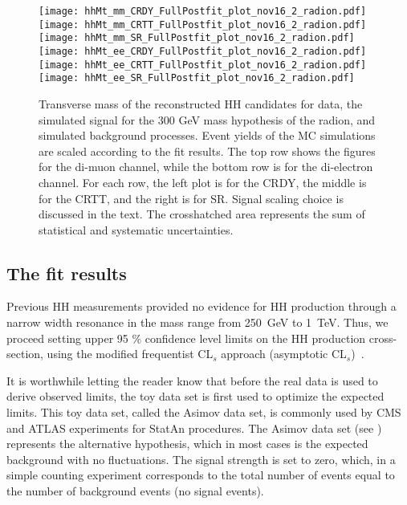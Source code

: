 \begin{figure}[H]
\begin{center}
\texttt{[image: hhMt\_mm\_CRDY\_FullPostfit\_plot\_nov16\_2\_radion.pdf]}
\texttt{[image: hhMt\_mm\_CRTT\_FullPostfit\_plot\_nov16\_2\_radion.pdf]}
\texttt{[image: hhMt\_mm\_SR\_FullPostfit\_plot\_nov16\_2\_radion.pdf]} \\
\texttt{[image: hhMt\_ee\_CRDY\_FullPostfit\_plot\_nov16\_2\_radion.pdf]}
\texttt{[image: hhMt\_ee\_CRTT\_FullPostfit\_plot\_nov16\_2\_radion.pdf]}
\texttt{[image: hhMt\_ee\_SR\_FullPostfit\_plot\_nov16\_2\_radion.pdf]}
\caption[Transverse mass of the reconstructed HH candidates for graviton hypothesis.]{Transverse mass of the reconstructed HH candidates for data, the simulated signal for the 300 GeV mass hypothesis of the radion, and simulated background processes. Event yields of the MC simulations are scaled according to the fit results. The top row shows the figures for the di-muon channel, while the bottom row is for the di-electron channel. For each row, the left plot is for the CRDY, the middle is for the CRTT, and the right is for SR. Signal scaling choice is discussed in the text. The crosshatched area represents the sum of statistical and systematic uncertainties.}
\label{MCcomparisons_radion} 
\end{center}
\end{figure}

\subsection{The fit results}
\label{sec:fit_results}

Previous HH measurements provided no evidence for HH production through a narrow width resonance in the mass range from 250~GeV to 1~TeV. Thus, we proceed setting upper 95 \% confidence level limits on the HH production cross-section, using the modified frequentist CL$_s$ approach (asymptotic CL$_s$)~\cite{Junk:1999kv,LEP-CLs, HIG-11-011, Cowan:2010js}.

It is worthwhile letting the reader know that before the real data is used to derive observed limits, the toy data set is first used to optimize the expected limits. This toy data set, called the Asimov data set, is commonly used by CMS and ATLAS experiments for StatAn procedures. The Asimov data set (see \cite{Cowan:2010js}) represents the alternative hypothesis, which in most cases is the expected background with no fluctuations. The signal strength is set to zero, which, in a simple counting experiment \cite{expected_limit_asimov} corresponds to the total number of events equal to the number of background events (no signal events). 

